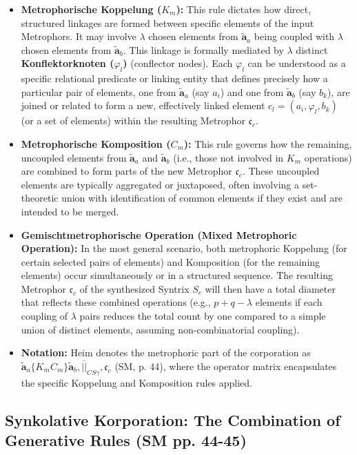 \documentclass[
    12pt,              %
    a4paper,           %
    headings=normal,   %
    twoside=true,      %
    BCOR=8mm,          %
]{scrbook}
\newcommand{\metrophor}{\bm{\widetilde{a}}}
\begin{document}
\begin{itemize}
    \item   \textbf{Metrophorische Koppelung (\(K_m\)):} This rule dictates how direct, structured linkages are formed between specific elements of the input Metrophors. It may involve \(\lambda\) chosen elements from \(\metrophor_a\) being coupled with \(\lambda\) chosen elements from \(\metrophor_b\). This linkage is formally mediated by \(\lambda\) distinct \textbf{Konflektorknoten (\(\varphi_l\))} (conflector nodes). Each \(\varphi_l\) can be understood as a specific relational predicate or linking entity that defines precisely how a particular pair of elements, one from \(\metrophor_a\) (say \(a_i\)) and one from \(\metrophor_b\) (say \(b_k\)), are joined or related to form a new, effectively linked element \(c_l = (a_i, \varphi_l, b_k)\) (or a set of elements) within the resulting Metrophor \(\mathfrak{c}_c\).
    \item   \textbf{Metrophorische Komposition (\(C_m\)):} This rule governs how the remaining, uncoupled elements from \(\metrophor_a\) and \(\metrophor_b\) (i.e., those not involved in \(K_m\) operations) are combined to form parts of the new Metrophor \(\mathfrak{c}_c\). These uncoupled elements are typically aggregated or juxtaposed, often involving a set-theoretic union with identification of common elements if they exist and are intended to be merged.
    \item   \textbf{Gemischtmetrophorische Operation (Mixed Metrophoric Operation):} In the most general scenario, both metrophoric Koppelung (for certain selected pairs of elements) and Komposition (for the remaining elements) occur simultaneously or in a structured sequence. The resulting Metrophor \(\mathfrak{c}_c\) of the synthesized Syntrix \(S_c\) will then have a total diameter that reflects these combined operations (e.g., \(p+q-\lambda\) elements if each coupling of \(\lambda\) pairs reduces the total count by one compared to a simple union of distinct elements, assuming non-combinatorial coupling).
    \item   \textbf{Notation:} Heim denotes the metrophoric part of the corporation as \(\metrophor_a \{K_m C_m\} \metrophor_b, \overline{||}_{CS\gamma}, \mathfrak{c}_c\) (SM, p. 44), where the operator matrix encapsulates the specific Koppelung and Komposition rules applied.
\end{itemize}

\subsection{Synkolative Korporation: The Combination of Generative Rules (SM pp. 44-45)}
\label{sec:ch3_synkolative_korporation_original} 
\end{document}
